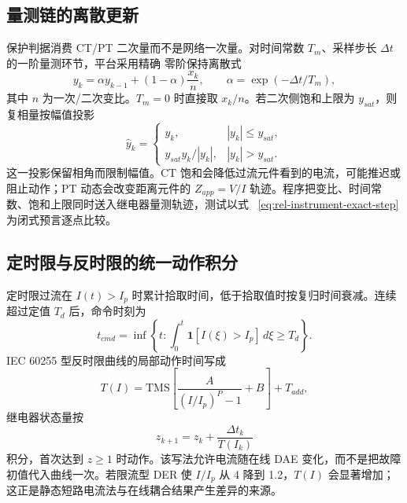 \subsection{量测链的离散更新}
保护判据消费 CT/PT 二次量而不是网络一次量。对时间常数 $T_m$、采样步长 $\Delta t$ 的一阶量测环节，平台采用精确
零阶保持离散式
\begin{equation}\label{eq:rel-instrument-exact-step}
 y_k=\alpha y_{k-1}+(1-\alpha)\frac{x_k}{n},\qquad
 \alpha=\exp(-\Delta t/T_m),
\end{equation}
其中 $n$ 为一次/二次变比。$T_m=0$ 时直接取 $x_k/n$。若二次侧饱和上限为 $y_{sat}$，则复相量按幅值投影
\begin{equation}
 \widehat y_k=
 \begin{cases}
 y_k,&|y_k|\le y_{sat},\\
 y_{sat}y_k/|y_k|,&|y_k|>y_{sat}.
 \end{cases}
\end{equation}
这一投影保留相角而限制幅值。CT 饱和会降低过流元件看到的电流，可能推迟或阻止动作；PT 动态会改变距离元件的
$Z_{app}=V/I$ 轨迹。程序把变比、时间常数、饱和上限同时送入继电器量测轨迹，测试以式
~\eqref{eq:rel-instrument-exact-step} 为闭式预言逐点比较。

\subsection{定时限与反时限的统一动作积分}
定时限过流在 $I(t)>I_p$ 时累计拾取时间，低于拾取值时按复归时间衰减。连续超过定值 $T_d$ 后，命令时刻为
\begin{equation}
 t_{cmd}=\inf\left\{t:\int_0^t\mathbf1[I(\xi)>I_p]\,d\xi\ge T_d\right\}.
\end{equation}
IEC 60255 型反时限曲线的局部动作时间写成
\begin{equation}
 T(I)=\mathrm{TMS}\left[\frac{A}{(I/I_p)^P-1}+B\right]+T_{add},
\end{equation}
继电器状态量按
\begin{equation}
 z_{k+1}=z_k+\frac{\Delta t_k}{T(I_k)}
\end{equation}
积分，首次达到 $z\ge1$ 时动作。该写法允许电流随在线 DAE 变化，而不是把故障初值代入曲线一次。若限流型 DER 使
$I/I_p$ 从 4 降到 1.2，$T(I)$ 会显著增加；这正是静态短路电流法与在线耦合结果产生差异的来源。

